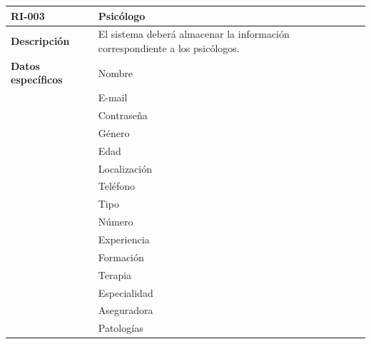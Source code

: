 \begin{table}[htpb]
\centering
\begin{tabularx}{\textwidth}{|l|X|}
\hline
\rowcolor[gray]{0.9}\textbf{RI-003}             & \textbf{Psicólogo}                                                                    \\ \hline
\textbf{Descripción}        & El sistema deberá almacenar la información correspondiente a los psicólogos. \\ \hline
\textbf{Datos específicos}  & Nombre                                                                       \\ \hline
\multirow{18}{*}{} & E-mail                                                                       \\ 
                   & Contraseña                                                                   \\  
                   & Género                                                                       \\ 
                   & Edad                                                                         \\  
                   & Localización                                                                 \\ 
                   & Teléfono                                                                     \\ 
                   & Tipo                                                                         \\ 
                   & Número                                                                       \\  
                   & Experiencia                                                                  \\ 
                   & Formación                                                                    \\ 
                   & Terapia                                                                      \\ 
                   & Especialidad                                                                 \\ 
                   & Aseguradora                                                                  \\  
                   & Patologías                                                                   \\  

\end{tabularx}
\end{table}
